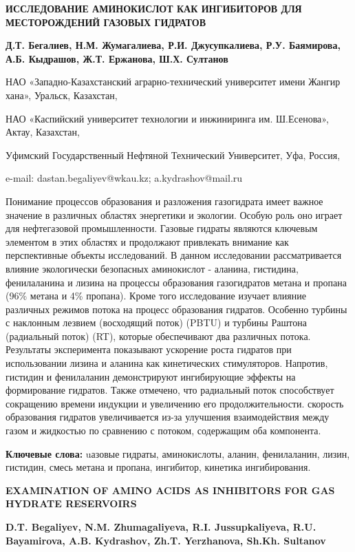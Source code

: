 \begin{header}
{\bfseries ИССЛЕДОВАНИЕ АМИНОКИСЛОТ КАК ИНГИБИТОРОВ ДЛЯ МЕСТОРОЖДЕНИЙ ГАЗОВЫХ ГИДРАТОВ}

{\bfseries
{}Д.Т. Бегалиев\envelope,
Н.М. Жумагалиева,
Р.И. Джусупкалиева,
Р.У. Баямирова,
А.Б. Кыдрашов\envelope,
Ж.Т. Ержанова,
Ш.Х. Султанов
}
\end{header}

\begin{affil}
НАО «Западно-Казахстанский аграрно-технический университет имени Жангир хана», Уральск, Казахстан,

НАО «Каспийский университет технологии и инжиниринга им. Ш.Есенова», Актау, Казахстан,

Уфимский Государственный Нефтяной Технический Университет, Уфа, Россия,

e-mail: dastan.begaliyev@wkau.kz; a.kydrashov@mail.ru
\end{affil}

Понимание процессов образования и разложения газогидрата имеет важное
значение в различных областях энергетики и экологии. Особую роль оно
играет для нефтегазовой промышленности. Газовые гидраты являются
ключевым элементом в этих областях и продолжают привлекать внимание как
перспективные объекты исследований. В данном исследовании
рассматривается влияние экологически безопасных аминокислот - аланина,
гистидина, фенилаланина и лизина на процессы образования газогидратов
метана и пропана (96\% метана и 4\% пропана). Кроме того исследование
изучает влияние различных режимов потока на процесс образования
гидратов. Особенно турбины с наклонным лезвием (восходящий поток) (PBTU)
и турбины Раштона (радиальный поток) (RT), которые обеспечивают два
различных потока. Результаты эксперимента показывают ускорение роста
гидратов при использовании лизина и аланина как кинетических
стимуляторов. Напротив, гистидин и фенилаланин демонстрируют
ингибирующие эффекты на формирование гидратов. Также отмечено, что
радиальный поток способствует сокращению времени индукции и увеличению
его продолжительности. скорость образования гидратов увеличивается из-за
улучшения взаимодействия между газом и жидкостью по сравнению с потоком,
содержащим оба компонента.

{\bfseries Ключевые слова:} uазовые гидраты, аминокислоты, аланин,
фенилаланин, лизин, гистидин, смесь метана и пропана, ингибитор,
кинетика ингибирования.

\begin{header}
{\bfseries EXAMINATION OF AMINO ACIDS AS INHIBITORS FOR GAS HYDRATE RESERVOIRS}

{\bfseries
{}D.T. Begaliyev\envelope,
N.M. Zhumagaliyeva,
R.I. Jussupkaliyeva,
R.U. Bayamirova,
A.B. Kydrashov\envelope ,
Zh.T. Yerzhanova,
Sh.Kh. Sultanov
}
\end{header}

